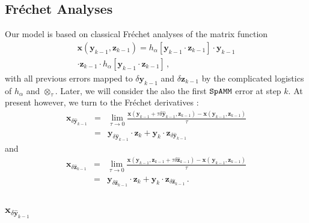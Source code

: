 \documentclass[letterpaper,twocolumn,amsmath,amsfont,amssymb,english,aps,jcp,preprintnumbers,groupaddress,nofootinbib,tightenlines]{revtex4}
\newcommand{\mat}[1]{\boldsymbol{#1}}
\newcommand{\ot}{ {\scriptstyle \otimes}_{ \tau } }
\begin{document}
\subsection{Fr\'{e}chet Analyses}

Our model is based on classical Fr\'{e}chet analyses \cite{} of the matrix function 
\begin{multline}
 \mat{x} \left( \mat{y}_{k-1}, \mat{z}_{k-1}  \right)= h_\alpha \left[ \mat{y}_{k-1} \cdot \mat{z}_{k-1} \right] \cdot  \mat{y}_{k-1}  \\
 \cdot  \mat{z}_{k-1} \cdot h_\alpha \left[ \mat{y}_{k-1} \cdot \mat{z}_{k-1} \right] \, ,
\end{multline}
with all previous errors mapped to $\delta \mat{y}_{k-1}$ and $\delta \mat{z}_{k-1}$ by the complicated logistics of $h_\alpha$ and $\ot$. 
Later, we will consider the also the  first $\tt SpAMM$ error at step $k$.  At present however, we turn to the Fr\'{e}chet derivatives \cite{}:
 \begin{eqnarray}
  \mat{x}_{\delta \widehat{ \mat{y}}_{k-1}} &=& \lim_{\tau \rightarrow 0} \frac{ \mat{x} \left( \mat{y}_{k-1} + \tau \delta \widehat{\mat{y}}_{k-1} ,  {\mat{z}}_{k-1}  \right)
 -\mat{x} \left( \mat{y}_{k-1}  ,  {\mat{z}}_{k-1} \right)  }{\tau}  \nonumber  \\[0.1cm] 
&=&   \mat{y}_{\delta \widehat{ \mat{y}}_{k-1}} \cdot \mat{z}_{k}  + \mat{y}_{k}  \cdot \mat{z}_{\delta \widehat{ \mat{y}}_{k-1}} 
 \end{eqnarray}
and 
 \begin{eqnarray}
 \mat{x}_{\delta \widehat{ \mat{z}}_{k-1}} &=& \lim_{\tau \rightarrow 0} 
\frac{ \mat{x} \left( {\mat{y}}_{k-1} , \mat{z}_{k-1} +\tau  \delta \widehat{\mat{z}}_{k-1} \right)
     - \mat{x} \left(\, {\mat{y}}_{k-1} , \mat{z}_{k-1} \right)  }{\tau} \nonumber  \\[0.1cm] 
&=& \mat{y}_{\delta \widehat{ \mat{z}}_{k-1}} \cdot \mat{z}_{k}  + \mat{y}_{k}  \cdot \mat{z}_{\delta \widehat{ \mat{z}}_{k-1}} \, . 
 \end{eqnarray}


\subsubsection{$\mat{x}_{\delta \widehat{ \mat{y}}_{k-1}}$}
\end{document}
